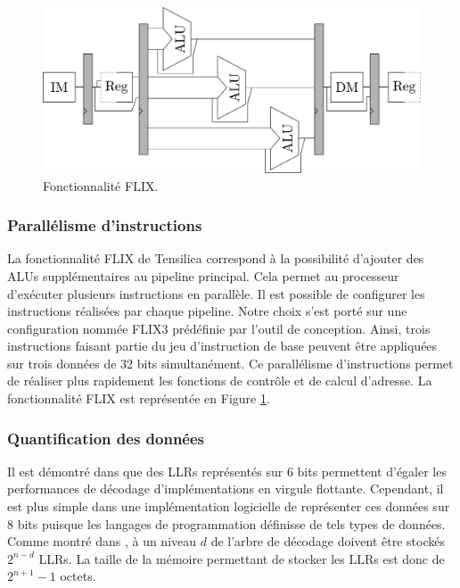 \begin{figure}
\centering
\includegraphics[width=\textwidth]{main/ch3_fig/flix}
\caption{Fonctionnalité FLIX.}
\label{fig:flix}
\end{figure}

\subsubsection{Parallélisme d'instructions}


La fonctionnalité FLIX de Tensilica correspond à la possibilité d'ajouter des ALUs supplémentaires au pipeline principal. Cela permet au processeur d'exécuter plusieurs instructions en parallèle. Il est possible de configurer les instructions réalisées par chaque pipeline. Notre choix s'est porté sur une configuration nommée FLIX3 prédéfinie par l'outil de conception. Ainsi, trois instructions faisant partie du jeu d'instruction de base peuvent être appliquées sur trois données de 32 bits simultanément. Ce parallélisme d'instructions permet de réaliser plus rapidement les fonctions de contrôle et de calcul d'adresse. La fonctionnalité FLIX est représentée en Figure \ref{fig:flix}.

\subsubsection{Quantification des données}
Il est démontré dans \cite{sarkis_fast_2014} que des LLRs représentés sur 6 bits permettent d'égaler les performances de décodage d'implémentations en virgule flottante. Cependant, il est plus simple dans une implémentation logicielle de représenter ces données sur 8 bits puisque les langages de programmation définisse de tels types de données. Comme montré dans \cite{leroux_hardware_2011}, à un niveau $d$ de l'arbre de décodage doivent être stockés $2^{n-d}$ LLRs. La taille de la mémoire permettant de stocker les LLRs est donc de $2^{n+1}-1$ octets.

